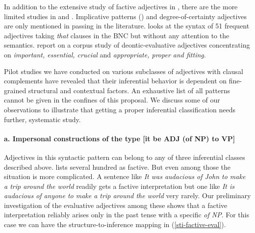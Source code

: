 \documentclass[10pt]{article}
\begin{document}
 
In addition to the extensive study of factive adjectives in \cite{norrick:1978},
there are the more limited studies in \cite{wilkinson:1970} and \cite{barker:2002}. Implicative patterns (\cite{karttunen:1971}) and degree-of-certainty adjectives are only mentioned in passing in the literature. \cite{mindt:2011} looks at the syntax of 51 frequent adjectives taking \emph{that }clauses in the BNC but without any attention to the semantics.\cite{vanlinden+davidse:2009} report on a corpus study of deontic-evaluative adjectives concentrating on \emph{important, essential, crucial} and \emph{appropriate, proper and fitting}. 

Pilot studies we have conducted on various subclasses of adjectives with clausal complements have revealed  that their inferential behavior is dependent on fine-grained structural and contextual factors. 
 An exhaustive list of all patterns cannot be given in the confines of this proposal. We discuss some of our observations to illustrate that getting a proper inferential classification  needs further, systematic study.

\vspace{-.1in}
\paragraph{a. Impersonal constructions of the type [it be ADJ (of NP) to VP]}
 Adjectives in this syntactic pattern can belong to any of three inferential classes described above. 
\cite{norrick:1978} lists several hundred as factive. But even among those 
the situation is more complicated. A sentence like \textit{It was audacious of John to make a trip around the world} readily gets a factive interpretation but one like \textit{It is audacious of anyone to make a trip around the world} very rarely. Our preliminary investigation of the evaluative adjectives among these shows that a factive interpretation reliably arises only in the past tense with a specific \textit{of NP}. For this case we can have the structure-to-inference mapping in (\ref{sti-factive-eval}).
\end{document}
